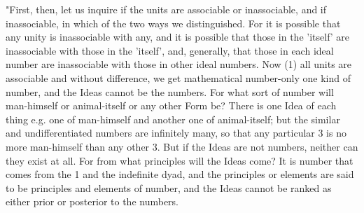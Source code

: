 "First, then, let us inquire if the units are associable or inassociable,
and if inassociable, in which of the two ways we distinguished. For
it is possible that any unity is inassociable with any, and it is
possible that those in the 'itself' are inassociable with those in
the 'itself', and, generally, that those in each ideal number are
inassociable with those in other ideal numbers. Now (1) all units
are associable and without difference, we get mathematical number-only
one kind of number, and the Ideas cannot be the numbers. For what
sort of number will man-himself or animal-itself or any other Form
be? There is one Idea of each thing e.g. one of man-himself and another
one of animal-itself; but the similar and undifferentiated numbers
are infinitely many, so that any particular 3 is no more man-himself
than any other 3. But if the Ideas are not numbers, neither can they
exist at all. For from what principles will the Ideas come? It is
number that comes from the 1 and the indefinite dyad, and the principles
or elements are said to be principles and elements of number, and
the Ideas cannot be ranked as either prior or posterior to the numbers.


